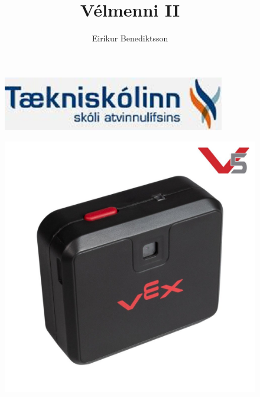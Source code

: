 \documentclass{article}
\begin{document}
\title{Vélmenni II}
\author{Eiríkur Benediktsson}
\maketitle
\begin{figure}[h]
\centering
\includegraphics[scale=.65]{img/tskoli}
\end{figure}
\begin{figure}[h]
\centering
\includegraphics[scale=.2]{img/visionsensor}
\end{figure}
\newpage
\tableofcontents
\newpage



\newpage



\newpage



\newpage

\end{document}
